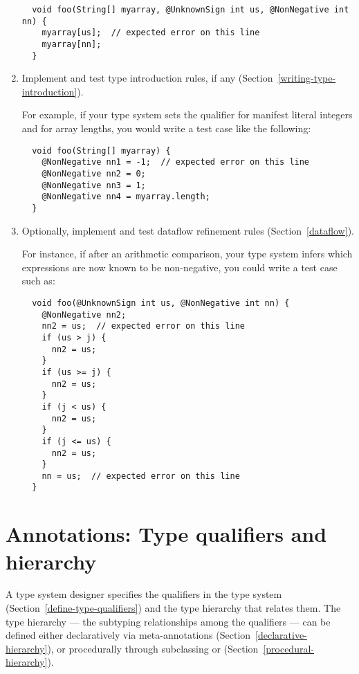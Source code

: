 \begin{enumerate}
\begin{Verbatim}
  void foo(String[] myarray, @UnknownSign int us, @NonNegative int nn) {
    myarray[us];  // expected error on this line
    myarray[nn];
  }
\end{Verbatim}

\item
  Implement and test type introduction rules, if any (Section~\ref{writing-type-introduction}).

  For example, if your type system sets the qualifier for manifest literal
  integers and for array lengths, you would write a test case like the following:

\begin{Verbatim}
  void foo(String[] myarray) {
    @NonNegative nn1 = -1;  // expected error on this line
    @NonNegative nn2 = 0;
    @NonNegative nn3 = 1;
    @NonNegative nn4 = myarray.length;
  }
\end{Verbatim}

\item
  Optionally, implement and test dataflow refinement rules
  (Section~\ref{dataflow}).

  For instance, if after an arithmetic comparison, your type system infers
  which expressions are now known to be non-negative, you could write a
  test case such as:

\begin{Verbatim}
  void foo(@UnknownSign int us, @NonNegative int nn) {
    @NonNegative nn2;
    nn2 = us;  // expected error on this line
    if (us > j) {
      nn2 = us;
    }
    if (us >= j) {
      nn2 = us;
    }
    if (j < us) {
      nn2 = us;
    }
    if (j <= us) {
      nn2 = us;
    }
    nn = us;  // expected error on this line
  }
\end{Verbatim}

\end{enumerate}




\section{Annotations: Type qualifiers and hierarchy\label{writing-typequals}}

A type system designer specifies the qualifiers in the type system (Section~\ref{define-type-qualifiers})
and
the type hierarchy that relates them.
The type hierarchy --- the subtyping relationships among the qualifiers ---
can be defined either
declaratively via meta-annotations (Section~\ref{declarative-hierarchy}), or procedurally through
subclassing  or
 (Section~\ref{procedural-hierarchy}).


